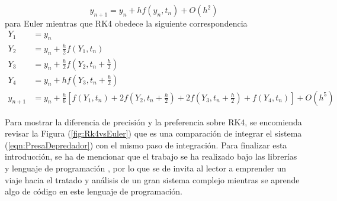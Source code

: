 \begin{equation}\label{eqn:Euler}
	y_{n+1}=y_n+hf(y_n,t_n)+O(h^2)
\end{equation}
para Euler mientras que RK4 obedece la siguiente correspondencia
\begin{equation}\label{eqn:RK4}
	\begin{split}
		Y_1 &= y_n\\
		Y_2 &= y_n+\frac{h}{2}f(Y_1,t_n)\\
		Y_3 &= y_n+\frac{h}{2}f\left (Y_2,t_n+\frac{h}{2}\right )\\
		Y_4 &= y_n+hf\left (Y_3,t_n+\frac{h}{2}\right )\\
		y_{n+1} &= y_n+\frac{h}{6}\left [f(Y_1,t_n)+2f\left (Y_2,t_n+\frac{h}{2}\right)+ 2f\left (Y_3,t_n+\frac{h}{2}\right )+f(Y_4,t_n)\right ]+O(h^5)
	\end{split}
\end{equation}

Para mostrar la diferencia de precisión y la preferencia sobre RK4, se encomienda revisar la Figura (\ref{fig:Rk4vsEuler}) que es una comparación de integrar el sistema (\ref{eqn:PresaDepredador}) con el mismo paso de integración. Para finalizar esta introducción, se ha de mencionar que el trabajo se ha realizado bajo las librerías y lenguaje de programación \julia, por lo que se de invita al lector a emprender un viaje hacia el tratado y análisis de un gran sistema complejo mientras se aprende algo de código en este lenguaje de programación.

 


